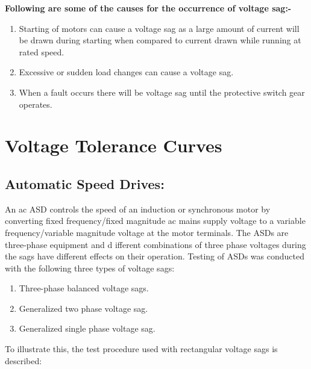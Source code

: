 \documentclass[14pt, a4paper]{extreport}
\begin{document}
\textbf{Following are some of the causes for the occurrence of voltage sag:-}\begin{enumerate}
    \item Starting of motors can cause a voltage sag as a large amount of current will be drawn during starting when compared to current drawn while running at rated speed.
    
    \item Excessive or sudden load changes can cause a voltage sag.
    
    \item 	When a fault occurs there will be voltage sag until the protective switch gear operates.
\end{enumerate}

\section[Voltage Tolerance Curves]{Voltage Tolerance Curves}
\subsection{Automatic Speed Drives:} An ac ASD controls the speed of an induction or synchronous motor by converting fixed frequency/fixed magnitude ac mains supply voltage to a variable frequency/variable magnitude voltage at the motor terminals.  The ASDs are three-phase equipment and d ifferent combinations of three phase voltages during the sags have different effects on their operation. Testing of ASDs was conducted with the following three types of voltage sags:

\begin{enumerate}
    \item Three-phase balanced voltage sags.
    \item Generalized two phase voltage sag.
    \item Generalized single phase voltage sag.
\end{enumerate}

 To illustrate this, the test procedure used with rectangular voltage sags is described: 
 
\end{document}
